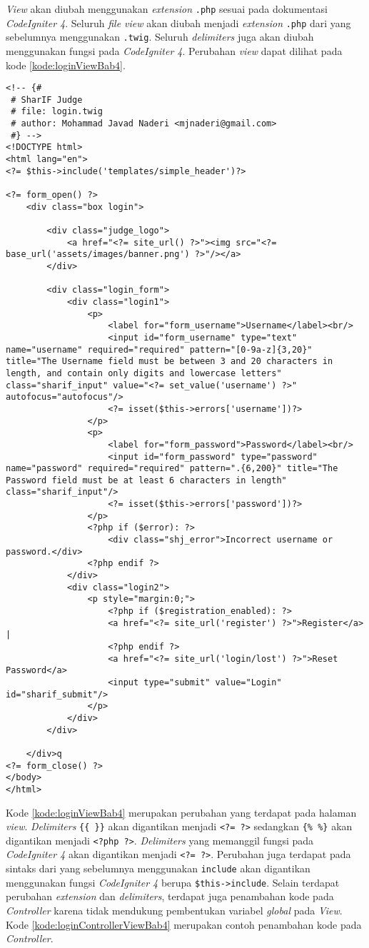 \textit{View} akan diubah menggunakan \textit{extension} \texttt{.php} sesuai pada dokumentasi \textit{CodeIgniter 4}. Seluruh \textit{file view} akan diubah menjadi \textit{extension} \texttt{.php} dari yang sebelumnya menggunakan \texttt{.twig}. Seluruh \textit{delimiters} juga akan diubah menggunakan fungsi pada \textit{CodeIgniter 4}. Perubahan \textit{view} dapat dilihat pada kode \ref{kode:loginViewBab4}.

\begin{lstlisting}[caption=Perubahan \textit{view} pada \textit{Login.php}, label=kode:loginViewBab4]
<!-- {#
 # SharIF Judge
 # file: login.twig
 # author: Mohammad Javad Naderi <mjnaderi@gmail.com>
 #} -->
<!DOCTYPE html>
<html lang="en">
<?= $this->include('templates/simple_header')?>

<?= form_open() ?>
	<div class="box login">

		<div class="judge_logo">
			<a href="<?= site_url() ?>"><img src="<?= base_url('assets/images/banner.png') ?>"/></a>
		</div>

		<div class="login_form">
			<div class="login1">
				<p>
					<label for="form_username">Username</label><br/>
					<input id="form_username" type="text" name="username" required="required" pattern="[0-9a-z]{3,20}" title="The Username field must be between 3 and 20 characters in length, and contain only digits and lowercase letters" class="sharif_input" value="<?= set_value('username') ?>" autofocus="autofocus"/>
					<?= isset($this->errors['username'])?>
				</p>
				<p>
					<label for="form_password">Password</label><br/>
					<input id="form_password" type="password" name="password" required="required" pattern=".{6,200}" title="The Password field must be at least 6 characters in length" class="sharif_input"/>
					<?= isset($this->errors['password'])?>
				</p>
				<?php if ($error): ?>
					<div class="shj_error">Incorrect username or password.</div>
				<?php endif ?>
			</div>
			<div class="login2">
				<p style="margin:0;">
					<?php if ($registration_enabled): ?>
					<a href="<?= site_url('register') ?>">Register</a> |
					<?php endif ?>
					<a href="<?= site_url('login/lost') ?>">Reset Password</a>
					<input type="submit" value="Login" id="sharif_submit"/>
				</p>
			</div>
		</div>

	</div>q
<?= form_close() ?>
</body>
</html>
\end{lstlisting}

Kode \ref{kode:loginViewBab4} merupakan perubahan yang terdapat pada halaman \textit{view}. \textit{Delimiters} \verb|{{ }}| akan digantikan menjadi \texttt{<?= ?>} sedangkan \verb|{% %}| akan digantikan menjadi \texttt{<?php ?>}. \textit{Delimiters} yang memanggil fungsi pada \textit{CodeIgniter 4} akan digantikan menjadi \texttt{<?= ?>}. Perubahan juga terdapat pada sintaks dari yang sebelumnya menggunakan \texttt{include} akan digantikan menggunakan fungsi \textit{CodeIgniter 4} berupa \verb|$this->include|. Selain terdapat perubahan \textit{extension} dan \textit{delimiters}, terdapat juga penambahan kode pada \textit{Controller} karena tidak mendukung pembentukan variabel \textit{global} pada \textit{View}. Kode \ref{kode:loginControllerViewBab4} merupakan contoh penambahan kode pada \textit{Controller}.

